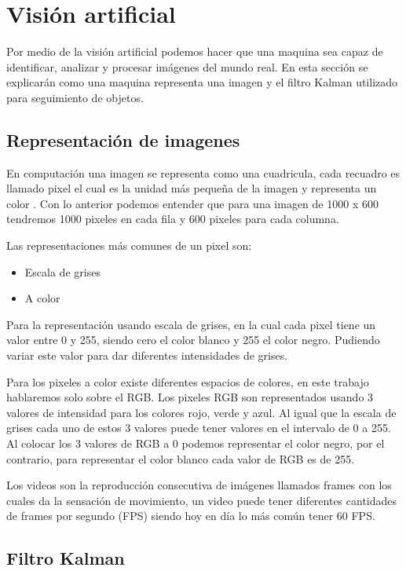 \section{Visión artificial}

Por medio de la visión artificial podemos hacer que una maquina sea capaz de identificar, analizar y procesar imágenes del mundo real. En esta sección se explicarán como una maquina representa una imagen y el filtro Kalman utilizado para seguimiento de objetos.

\subsection{Representación de imagenes}

En computación una imagen se representa como una cuadricula, cada recuadro es llamado pixel el cual es la unidad más pequeña de la imagen y representa un color \cite{rosebrock2017deep}. Con lo anterior podemos entender que para una imagen de 1000 x 600 tendremos 1000 pixeles en cada fila y 600 pixeles para cada columna.

Las representaciones más comunes de un pixel son:

\begin{itemize}
\item Escala de grises
\item A color
\end{itemize}


Para la representación usando escala de grises, en la cual cada pixel tiene un valor entre 0 y 255, siendo cero el color blanco y 255 el color negro. Pudiendo variar este valor para dar diferentes intensidades de grises.

Para los pixeles a color existe diferentes espacios de colores, en este trabajo hablaremos solo sobre el RGB. Los pixeles RGB son representados usando 3 valores de intensidad para los colores rojo, verde y azul. Al igual que la escala de grises cada uno de estos 3 valores puede tener valores en el intervalo de 0 a 255. Al colocar los 3 valores de RGB a 0 podemos representar el color negro, por el contrario, para representar el color blanco cada valor de RGB es de 255.

Los videos son la reproducción consecutiva de imágenes llamados frames con los cuales da la sensación de movimiento, un video puede tener diferentes cantidades de frames por segundo (FPS) siendo hoy en día lo más común tener 60 FPS.

\subsection{Filtro Kalman}

